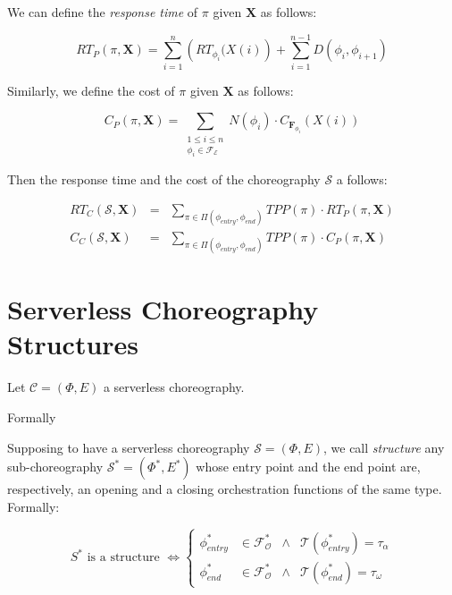\documentclass[10pt,a4paper]{report}
\theoremstyle{definition}
\begin{document}
We can define the \textit{response time} of $\pi$ given $\textbf{X}$ as follows:

\begin{equation}
	RT_P(\pi, \textbf{X}) = \sum_{i = 1}^n \left( RT_{\phi_i} (X(i) \right)  + \sum_{i = 1}^{n-1} D(\phi_i,\phi_{i+1})
\end{equation}

Similarly, we define the cost of $\pi$ given $\textbf{X}$ as follows:

\begin{equation}
	C_P(\pi, \textbf{X}) = \sum_{\substack{1\le i\le n\\ \phi_i \in \mathscr{F_E}}} N(\phi_i) \cdot C_{\textbf{F}_{\phi_i}} (X(i))
\end{equation}


Then the response time and the cost of the choreography $\mathcal{S}$ a follows:

\begin{eqnarray}
	RT_C(\mathcal{S}, \textbf{X}) & = & \sum_{\pi \in \Pi(\phi_{entry}, \phi_{end})} TPP(\pi) \cdot RT_{P}(\pi, \textbf{X}) \\
	C_C(\mathcal{S}, \textbf{X}) & = & \sum_{\pi \in \Pi(\phi_{entry}, \phi_{end})} TPP(\pi) \cdot C_{P}(\pi, \textbf{X}) 
\end{eqnarray}



\section{Serverless Choreography Structures}

Let $\mathcal{C} = (\Phi,E)$ a serverless choreography. 

Formally


Supposing to have a serverless choreography $\mathcal{S} = (\Phi,E)$, we call \textit{structure} any sub-choreography $\mathcal{S}^*= (\Phi^*,E^*)$ whose entry point and the end point are, respectively, an opening and a closing orchestration functions of the same type. Formally:

\begin{equation}
	S^* \text{ is a structure } \Leftrightarrow \left\{ \begin{array}{rlll}
		\phi_{entry}^* & \in \mathscr{F_O^*} & \wedge & \mathscr{T}(\phi_{entry}^*) = \tau_{\alpha} \\ 
		\phi_{end}^* & \in \mathscr{F_O^*} & \wedge & \mathscr{T}(\phi_{end}^*) = \tau_{\omega}
	\end{array} \right.
\end{equation}
\end{document}
